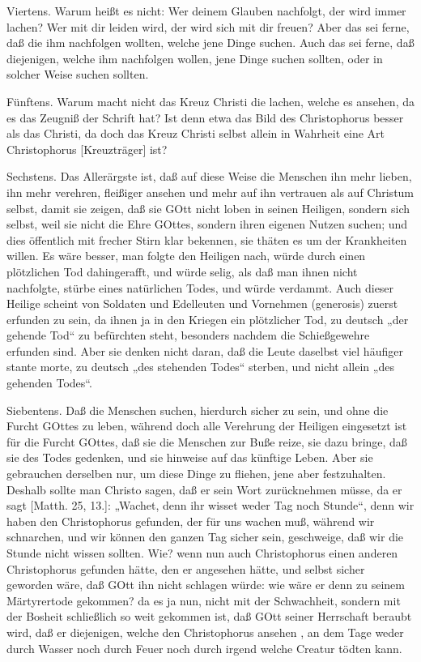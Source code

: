 Viertens. Warum heißt es nicht: Wer deinem Glauben nachfolgt, der wird immer lachen? Wer mit dir leiden wird, der wird sich mit dir freuen? Aber das sei ferne, daß die ihm nachfolgen wollten, welche jene Dinge suchen. Auch das sei ferne, daß diejenigen, welche ihm nachfolgen wollen, jene Dinge suchen sollten, oder in solcher Weise suchen sollten.

Fünftens. Warum macht nicht das Kreuz Christi die lachen, welche es ansehen, da es das Zeugniß der Schrift hat? Ist denn etwa das Bild des Christophorus besser als das Christi, da doch das Kreuz Christi selbst allein in Wahrheit eine Art Christophorus [Kreuzträger] ist?

Sechstens. Das Allerärgste ist, daß auf diese Weise die Menschen ihn mehr lieben, ihn mehr verehren, fleißiger ansehen und mehr auf ihn vertrauen als auf Christum selbst, damit sie zeigen, daß sie GOtt nicht loben in seinen Heiligen, sondern sich selbst, weil sie nicht die Ehre GOttes, sondern ihren eigenen Nutzen suchen; und dies öffentlich mit frecher Stirn klar bekennen, sie thäten es um der Krankheiten willen. Es wäre besser, man folgte den Heiligen nach, würde durch einen plötzlichen Tod dahingerafft, und würde selig, als daß man ihnen nicht nachfolgte, stürbe eines natürlichen Todes, und würde verdammt. Auch dieser Heilige scheint von Soldaten und Edelleuten und Vornehmen (generosis) zuerst erfunden zu sein, da ihnen ja in den Kriegen ein plötzlicher Tod, zu deutsch „der gehende Tod“ zu befürchten steht, besonders nachdem die Schießgewehre erfunden sind. Aber sie denken nicht daran, daß die Leute daselbst viel häufiger stante morte, zu deutsch „des stehenden Todes“ sterben, und nicht allein „des gehenden Todes“.

Siebentens. Daß die Menschen suchen, hierdurch sicher zu sein, und ohne die Furcht GOttes zu leben, während doch alle Verehrung der Heiligen eingesetzt ist für die Furcht GOttes, daß sie die Menschen zur Buße reize, sie dazu bringe, daß sie des Todes gedenken, und sie hinweise auf das künftige Leben. Aber sie gebrauchen derselben nur, um diese Dinge zu fliehen, jene aber festzuhalten. Deshalb sollte man Christo sagen, daß er sein Wort zurücknehmen müsse, da er sagt [Matth. 25, 13.]: „Wachet, denn ihr wisset weder Tag noch Stunde“, denn wir haben den Christophorus gefunden, der für uns wachen muß, während wir schnarchen, und wir können den ganzen Tag sicher sein, geschweige, daß wir die Stunde nicht wissen sollten. Wie? wenn nun auch Christophorus einen anderen Christophorus gefunden hätte, den er angesehen hätte, und selbst sicher geworden wäre, daß GOtt ihn nicht schlagen würde: wie wäre er denn zu seinem Märtyrertode gekommen? da es ja nun, nicht mit der Schwachheit, sondern mit der Bosheit schließlich so weit gekommen ist, daß GOtt seiner Herrschaft beraubt wird, daß er diejenigen, welche den Christophorus ansehen
, an dem Tage weder durch Wasser noch durch Feuer noch durch irgend welche Creatur tödten kann.

